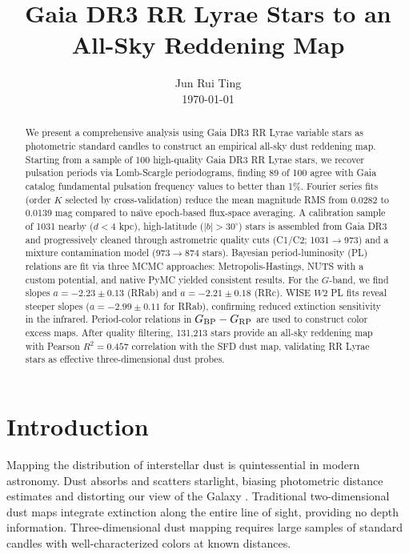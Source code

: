 \documentclass[10pt,preprint2]{aastex}
\begin{document}
\title{Gaia DR3 RR Lyrae Stars to an All-Sky Reddening Map}
\author{Jun Rui Ting \\ \today\vspace{-2.5\baselineskip}}

\begin{abstract}
We present a comprehensive analysis using Gaia DR3 RR Lyrae variable stars as photometric standard candles to construct an empirical all-sky dust reddening map. Starting from a sample of 100 high-quality Gaia DR3 RR Lyrae stars, we recover pulsation periods via Lomb-Scargle periodograms, finding 89 of 100 agree with Gaia catalog fundamental pulsation frequency values to better than 1\%. Fourier series fits (order $K$ selected by cross-validation) reduce the mean magnitude RMS from 0.0282 to 0.0139 mag compared to na\"{\i}ve epoch-based flux-space averaging. A calibration sample of 1031 nearby ($d < 4$ kpc), high-latitude ($|b| > 30^\circ$) stars is assembled from Gaia DR3 and progressively cleaned through astrometric quality cuts (C1/C2; 1031$\to$973) and a mixture contamination model (973$\to$874 stars). Bayesian period-luminosity (PL) relations are fit via three MCMC approaches: Metropolis-Hastings, NUTS with a custom potential, and native PyMC yielded consistent results. For the $G$-band, we find slopes $a = -2.23 \pm 0.13$ (RRab) and $a = -2.21 \pm 0.18$ (RRc). WISE $W2$ PL fits reveal steeper slopes ($a = -2.99 \pm 0.11$ for RRab), confirming reduced extinction sensitivity in the infrared. Period-color relations in $G_{\rm BP} - G_{\rm RP}$ are used to construct color excess maps. After quality filtering, 131,213 stars provide an all-sky reddening map with Pearson $R^2 = 0.457$ correlation with the SFD dust map, validating RR Lyrae stars as effective three-dimensional dust probes.

\vspace{2.5\baselineskip}
\end{abstract}

\section{Introduction}
\label{sec:intro}

Mapping the distribution of interstellar dust is quintessential in modern astronomy. Dust absorbs and scatters starlight, biasing photometric distance estimates and distorting our view of the Galaxy \citep{SFD1998}. Traditional two-dimensional dust maps \citep{SFD1998, Schlafly2011} integrate extinction along the entire line of sight, providing no depth information. Three-dimensional dust mapping requires large samples of standard candles with well-characterized colors at known distances.
\end{document}
